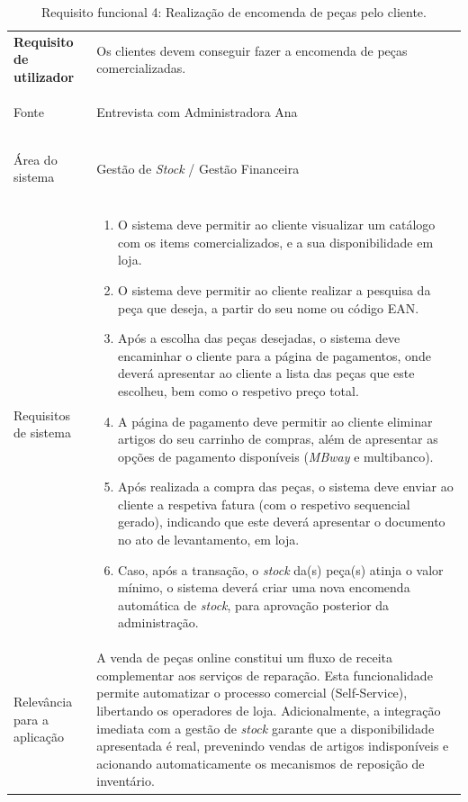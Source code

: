 \documentclass[a4paper,12pt]{scrreprt}
\begin{document}
\begin{table}[H]
    \centering
    \renewcommand{\arraystretch}{1.5} 
    
    \begin{tabular}{|>{\columncolor{gray!15}\bfseries}p{4cm}|p{10.5cm}|}
        \hline
        Requisito de utilizador & Os clientes devem conseguir fazer a encomenda de peças comercializadas. \\ \hdashline
        
        Fonte & Entrevista com Administradora Ana \\ \hdashline
        
        Área do sistema & Gestão de \textit{Stock} / Gestão Financeira\\ \hdashline
        
        Requisitos de sistema & 
        \begin{enumerate}[leftmargin=*, nosep, topsep=2pt, partopsep=0pt]
            \item O sistema deve permitir ao cliente visualizar um catálogo com os items comercializados, e a sua disponibilidade em loja.
            \item O sistema deve permitir ao cliente realizar a pesquisa da peça que deseja, a partir do seu nome ou código EAN.
            \item Após a escolha das peças desejadas, o sistema deve encaminhar o cliente para a página de pagamentos, onde deverá apresentar ao cliente a lista das peças que este escolheu, bem como o respetivo preço total.
            \item A página de pagamento deve permitir ao cliente eliminar artigos do seu carrinho de compras, além de apresentar as opções de pagamento disponíveis (\textit{MBway} e multibanco).
            \item Após realizada a compra das peças, o sistema deve enviar ao cliente a respetiva fatura (com o respetivo sequencial gerado), indicando que este deverá apresentar o documento no ato de levantamento, em loja.
            \item Caso, após a transação, o \textit{stock} da(s) peça(s) atinja o valor mínimo, o sistema deverá criar uma nova encomenda automática de \textit{stock}, para aprovação posterior da administração.
        \end{enumerate} \\ \hdashline
        
        Relevância para a aplicação & A venda de peças online constitui um fluxo de receita complementar aos serviços de reparação. Esta funcionalidade permite automatizar o processo comercial (Self-Service), libertando os operadores de loja. Adicionalmente, a integração imediata com a gestão de \textit{stock} garante que a disponibilidade apresentada é real, prevenindo vendas de artigos indisponíveis e acionando automaticamente os mecanismos de reposição de inventário.\\ \hline
    \end{tabular}
    \caption{Requisito funcional 4: Realização de encomenda de peças pelo cliente.}
    \label{tab:rf3}
\end{table}
\end{document}

